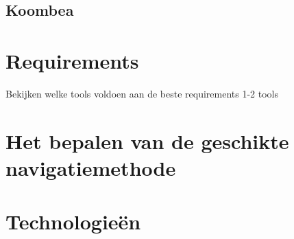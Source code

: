 \subsection{Koombea}
\label{sec:koombea}
\section{Requirements}
\label{sec:requirements}
Bekijken welke tools voldoen aan de beste requirements 1-2 tools
\section{Het bepalen van de geschikte navigatiemethode}
\label{sec:het bepalen van de geschikte navigatiemethode}
\section{Technologieën}
\label{sec:technologieën}

